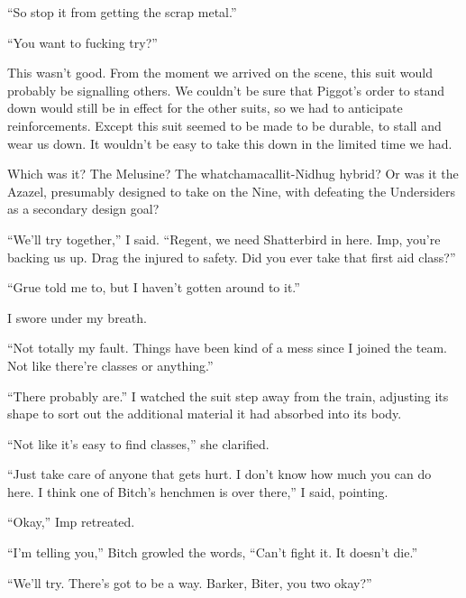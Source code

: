 ``So stop it from getting the scrap metal.''



``You want to fucking try?''



This wasn't good.  From the moment we arrived on the scene, this suit would probably be signalling others.  We couldn't be sure that Piggot's order to stand down would still be in effect for the other suits, so we had to anticipate reinforcements.  Except this suit seemed to be made to be durable, to stall and wear us down.  It wouldn't be easy to take this down in the limited time we had.



Which was it?  The Melusine?  The whatchamacallit-Nidhug hybrid?  Or was it the Azazel, presumably designed to take on the Nine, with defeating the Undersiders as a secondary design goal?



``We'll try together,'' I said.  ``Regent, we need Shatterbird in here.  Imp, you're backing us up.  Drag the injured to safety.  Did you ever take that first aid class?''



``Grue told me to, but I haven't gotten around to it.''



I swore under my breath.



``Not totally my fault.  Things have been kind of a mess since I joined the team.  Not like there're classes or anything.''



``There probably are.''  I watched the suit step away from the train, adjusting its shape to sort out the additional material it had absorbed into its body.



``Not like it's easy to find classes,'' she clarified.



``Just take care of anyone that gets hurt.  I don't know how much you can do here.  I think one of Bitch's henchmen is over there,'' I said, pointing.



``Okay,'' Imp retreated.



``I'm telling you,'' Bitch growled the words, ``Can't fight it.  It doesn't die.''



``We'll try.  There's got to be a way.  Barker, Biter, you two okay?''



